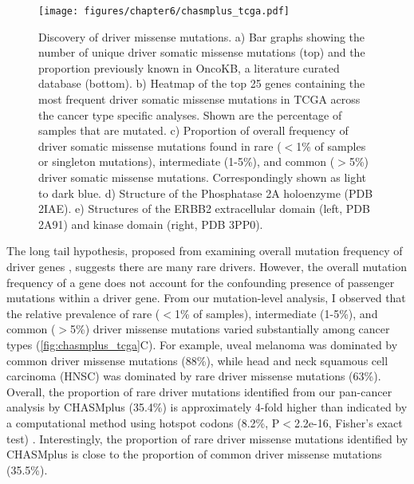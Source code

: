 \begin{figure}
  \centering
  \makeatletter
  \let\@currsize\normalsize
  \texttt{[image: figures/chapter6/chasmplus\_tcga.pdf]}
  \caption[Discovery of driver missense mutations by CHASMplus]{Discovery of driver missense mutations. a) Bar graphs showing the number of unique driver somatic missense mutations (top) and the proportion previously known in OncoKB, a literature curated database (bottom). b) Heatmap of the top 25 genes containing the most frequent driver somatic missense mutations in TCGA across the cancer type specific analyses. Shown are the percentage of samples that are mutated. c) Proportion of overall frequency of driver somatic missense mutations found in rare ($<$1\% of samples or singleton mutations), intermediate (1-5\%), and common ($>$5\%) driver somatic missense mutations. Correspondingly shown as light to dark blue. d) Structure of the Phosphatase 2A holoenzyme (PDB 2IAE). e) Structures of the ERBB2 extracellular domain (left, PDB 2A91) and kinase domain (right, PDB 3PP0).}
  \label{fig:chasmplus_tcga}
\end{figure}

The long tail hypothesis, proposed from examining overall mutation frequency of driver genes \cite{RN27, RN35}, suggests there are many rare drivers. However, the overall mutation frequency of a gene does not account for the confounding presence of passenger mutations within a driver gene. From our mutation-level analysis, I observed that the relative prevalence of rare ($<$1\% of samples), intermediate (1-5\%), and common ($>$5\%) driver missense mutations varied substantially among cancer types (\autoref{fig:chasmplus_tcga}C). For example, uveal melanoma was dominated by common driver missense mutations (88\%), while head and neck squamous cell carcinoma (HNSC) was dominated by rare driver missense mutations (63\%). Overall, the proportion of rare driver mutations identified from our pan-cancer analysis by CHASMplus (35.4\%) is approximately 4-fold higher than indicated by a computational method using hotspot codons (8.2\%, P$<$2.2e-16, Fisher's exact test) \cite{RN23}.   Interestingly, the proportion of rare driver missense mutations identified by CHASMplus is close to the proportion of common driver missense mutations (35.5\%).  

